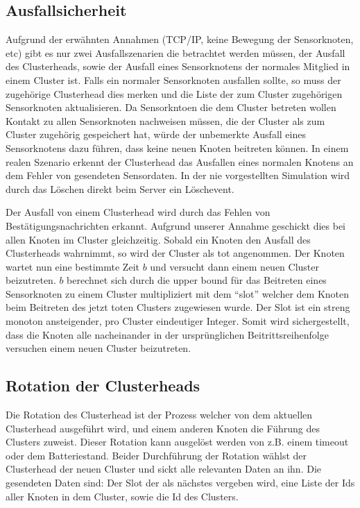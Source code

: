 \subsection{Ausfallsicherheit}
Aufgrund der erw\"ahnten Annahmen (TCP/IP, keine Bewegung der Sensorknoten, etc) gibt es nur zwei Ausfallszenarien die betrachtet werden m\"ussen, der Ausfall des Clusterheads, sowie der Ausfall eines Sensorknotens der normales Mitglied in einem Cluster ist.
Falls ein normaler Sensorknoten ausfallen sollte, so muss der zugeh\"orige Clusterhead dies merken und die Liste der zum Cluster zugeh\"origen Sensorknoten aktualisieren.
Da Sensorkntoen die dem Cluster betreten wollen Kontakt zu allen Sensorknoten nachweisen m\"ussen, die der Cluster als zum Cluster zugeh\"orig gespeichert hat, w\"urde der unbemerkte Ausfall eines Sensorknotens dazu f\"uhren, dass keine neuen Knoten beitreten k\"onnen.
In einem realen Szenario erkennt der Clusterhead das Ausfallen eines normalen Knotens an dem Fehler von gesendeten Sensordaten. In der nie vorgestellten Simulation wird durch das L\"oschen direkt beim Server ein L\"oschevent.

Der Ausfall von einem Clusterhead wird durch das Fehlen von Best\"atigungsnachrichten erkannt.
Aufgrund unserer Annahme geschickt dies bei allen Knoten im Cluster gleichzeitig.
Sobald ein Knoten den Ausfall des Clusterheads wahrnimmt, so wird der Cluster als tot angenommen.
Der Knoten wartet nun eine bestimmte Zeit $b$ und versucht dann einem neuen Cluster beizutreten.
$b$ berechnet sich durch die upper bound f\"ur das Beitreten eines Sensorknoten zu einem Cluster multipliziert mit dem ``slot'' welcher dem Knoten beim Beitreten des jetzt toten Clusters zugewiesen wurde.
Der Slot ist ein streng monoton ansteigender, pro Cluster eindeutiger Integer.
Somit wird sichergestellt, dass die Knoten alle nacheinander in der urspr\"unglichen Beitrittsreihenfolge versuchen einem neuen Cluster beizutreten.

\subsection{Rotation der Clusterheads}
Die Rotation des Clusterhead ist der Prozess welcher von dem aktuellen Clusterhead ausgef\"uhrt wird, und einem anderen Knoten die F\"uhrung des Clusters zuweist.
Dieser Rotation kann ausgel\"ost werden von z.B. einem timeout oder dem Batteriestand.
Beider Durchf\"uhrung der Rotation w\"ahlst der Clusterhead der neuen Cluster und sickt alle relevanten Daten an ihn.
Die gesendeten Daten sind:
Der Slot der als n\"achstes vergeben wird, eine Liste der Ids aller Knoten in dem Cluster, sowie die Id des Clusters.
